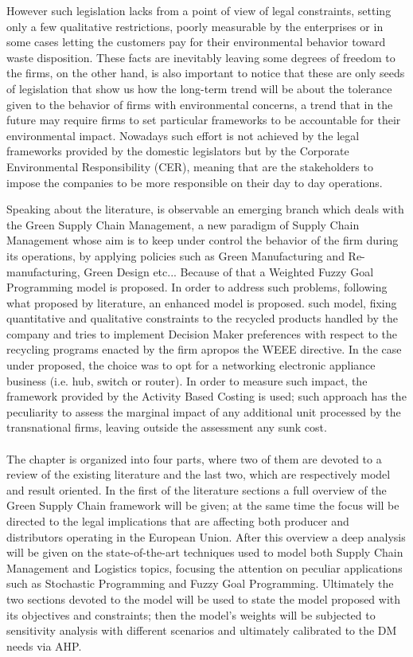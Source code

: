 \begin{doublespace}
  However such legislation lacks from a point of view of legal constraints, setting only a few qualitative restrictions, poorly measurable by the enterprises or in some cases letting the customers pay for their environmental behavior toward waste disposition. These facts are inevitably leaving some degrees of freedom to the firms, on the other hand, is also important to notice that these are only seeds of legislation that show us how the long-term trend will be about the tolerance given to the behavior of firms with environmental concerns, a trend that in the future may require firms to set particular frameworks to be accountable for their environmental impact. Nowadays such effort is not achieved by the legal frameworks provided by the domestic legislators but by the Corporate Environmental Responsibility (CER), meaning that are the stakeholders to impose the companies to be more responsible on their day to day operations.

Speaking about the literature, is observable an emerging branch which deals with the Green Supply Chain Management, a new paradigm of Supply Chain Management whose aim is to keep under control the behavior of the firm during its operations, by applying policies such as Green Manufacturing and Re-manufacturing, Green Design etc... Because of that a Weighted Fuzzy Goal Programming model is proposed. In order to address such problems, following what proposed by literature, an enhanced model is proposed. such model, fixing quantitative and qualitative constraints to the recycled products handled by the company and tries to implement Decision Maker preferences  with respect to the recycling programs enacted by the firm apropos the WEEE directive. In the case under proposed, the choice was to opt for a networking electronic appliance business (i.e. hub, switch or router).  In order to measure such impact, the framework provided by the Activity Based Costing is used; such approach has the peculiarity to assess the marginal impact of any additional unit processed by the transnational firms, leaving outside the assessment any sunk cost.
\\
\\
The chapter is organized into four parts, where two of them are devoted to a review of the existing literature and the last two, which are respectively model and result oriented. In the first of the literature sections a full overview of the Green Supply Chain framework will be given; at the same time the focus will be directed to the legal implications that are affecting both producer and distributors operating in the European Union. After this overview a deep analysis will be given on the state-of-the-art techniques used to model both Supply Chain Management and Logistics topics, focusing the attention on peculiar applications such as Stochastic Programming and Fuzzy Goal Programming. Ultimately the two sections devoted to the model will be used to state the model proposed with its objectives and constraints; then the model's weights will be subjected to sensitivity analysis with different scenarios and ultimately calibrated to the DM needs via AHP.


\end{doublespace}
